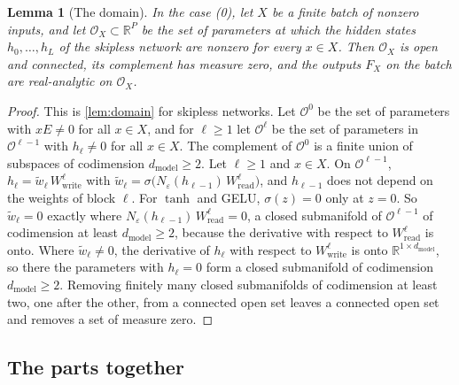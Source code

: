 \documentclass[10pt]{article}
\newtheorem{lemma}[theorem]{Lemma}
\theoremstyle{definition}
\theoremstyle{remark}
\newcommand{\R}{\mathbb{R}}
\newcommand{\Wread}{W_{\mathrm{read}}}
\newcommand{\Wwrite}{W_{\mathrm{write}}}
\newcommand{\dm}{d_{\mathrm{model}}}
\begin{document}
\begin{lemma}[The domain]\label{lem:e0domain}
In the case (0), let $X$ be a finite batch of nonzero inputs, and let $\mathcal O_X \subset \R^P$ be the set of parameters at which the hidden states $h_0, \dots, h_L$ of the skipless network are nonzero for every $x \in X$. Then $\mathcal O_X$ is open and connected, its complement has measure zero, and the outputs $F_X$ on the batch are real-analytic on $\mathcal O_X$.
\end{lemma}

\begin{proof}
This is \cref{lem:domain} for skipless networks. Let $\mathcal O^0$ be the set of parameters with $xE \neq 0$ for all $x \in X$, and for $\ell \ge 1$ let $\mathcal O^\ell$ be the set of parameters in $\mathcal O^{\ell-1}$ with $h_\ell \neq 0$ for all $x \in X$. The complement of $\mathcal O^0$ is a finite union of subspaces of codimension $\dm \ge 2$. Let $\ell \ge 1$ and $x \in X$. On $\mathcal O^{\ell-1}$, $h_\ell = \tilde w_\ell\,\Wwrite^{\ell}$ with $\tilde w_\ell = \sigma\big(N_\varepsilon(h_{\ell-1})\,\Wread^{\ell}\big)$, and $h_{\ell-1}$ does not depend on the weights of block $\ell$. For $\tanh$ and GELU, $\sigma(z) = 0$ only at $z = 0$. So $\tilde w_\ell = 0$ exactly where $N_\varepsilon(h_{\ell-1})\,\Wread^{\ell} = 0$, a closed submanifold of $\mathcal O^{\ell-1}$ of codimension at least $\dm \ge 2$, because the derivative with respect to $\Wread^{\ell}$ is onto. Where $\tilde w_\ell \neq 0$, the derivative of $h_\ell$ with respect to $\Wwrite^{\ell}$ is onto $\R^{1\times\dm}$, so there the parameters with $h_\ell = 0$ form a closed submanifold of codimension $\dm \ge 2$. Removing finitely many closed submanifolds of codimension at least two, one after the other, from a connected open set leaves a connected open set and removes a set of measure zero.
\end{proof}

\subsection{The parts together}\label{app:proofmain}
\end{document}
